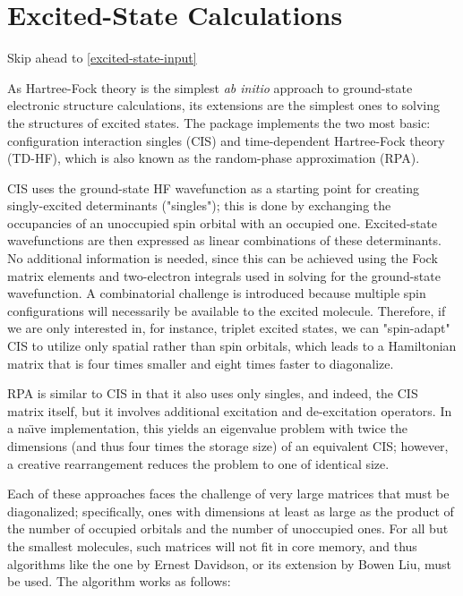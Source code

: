 \documentclass[12pt,letter,footinclude=true,headinclude=true,hyphens,oneside]{book} %
\begin{document}
    \section{Excited-State Calculations}
    
    Skip ahead to \ref{excited-state-input}
    
    As Hartree-Fock theory is the simplest \emph{ab initio} approach to ground-state electronic structure calculations, its extensions are the simplest ones to solving the structures of excited states. The package implements the two most basic: configuration interaction singles (CIS) and time-dependent Hartree-Fock theory (TD-HF), which is also known as the random-phase approximation (RPA).
    
    CIS uses the ground-state HF wavefunction as a starting point for creating singly-excited determinants ("singles"); this is done by exchanging the occupancies of an unoccupied spin orbital with an occupied one. Excited-state wavefunctions are then expressed as linear combinations of these determinants. No additional information is needed, since this can be achieved using the Fock matrix elements and two-electron integrals used in solving for the ground-state wavefunction. A combinatorial challenge is introduced because multiple spin configurations will necessarily be available to the excited molecule. Therefore, if we are only interested in, for instance, triplet excited states, we can "spin-adapt" CIS to utilize only spatial rather than spin orbitals, which leads to a Hamiltonian matrix that is four times smaller and eight times faster to diagonalize.
    
    RPA is similar to CIS in that it also uses only singles, and indeed, the CIS matrix itself, but it involves additional excitation and de-excitation operators. In a na\"{\i}ve implementation, this yields an eigenvalue problem with twice the dimensions (and thus four times the storage size) of an equivalent CIS; however, a creative rearrangement reduces the problem to one of identical size.
    
    Each of these approaches faces the challenge of very large matrices that must be diagonalized; specifically, ones with dimensions at least as large as the product of the number of occupied orbitals and the number of unoccupied ones. For all but the smallest molecules, such matrices will not fit in core memory, and thus algorithms like the one by Ernest Davidson, or its extension by Bowen Liu, must be used. The algorithm works as follows:
    
\end{document}
